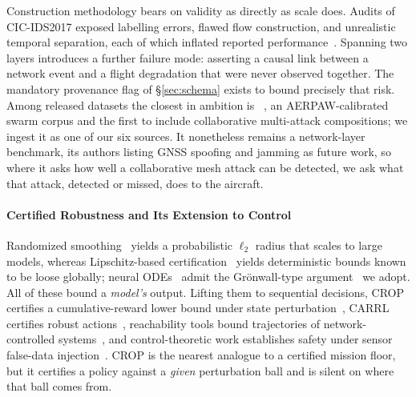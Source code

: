 Construction methodology bears on validity as directly as scale does. Audits of
CIC-IDS2017 exposed labelling errors, flawed flow construction, and unrealistic
temporal separation, each of which inflated reported
performance~\cite{engelen2021troubleshooting,sharafaldin2018cicids}. Spanning
two layers introduces a further failure mode: asserting a causal link between a
network event and a flight degradation that were never observed together. The
mandatory provenance flag of \S\ref{sec:schema} exists to bound precisely that
risk. Among released datasets the closest in ambition is
~\cite{uavcas2026}, an AERPAW-calibrated swarm corpus and the
first to include collaborative multi-attack compositions; we ingest it as one of
our six sources. It nonetheless remains a network-layer benchmark, its authors
listing GNSS spoofing and jamming as future work, so where it asks how well a
collaborative mesh attack can be detected, we ask what that attack, detected or
missed, does to the aircraft.

\paragraph{Certified Robustness and Its Extension to Control}
Randomized smoothing~\cite{cohen2019smoothing,salman2019provably} yields a
probabilistic $\ell_2$ radius that scales to large models, whereas
Lipschitz-based certification~\cite{pauli2022training,zhang2022rethinking}
yields deterministic bounds known to be loose globally; neural
ODEs~\cite{chen2018neuralode} admit the Gr\"onwall-type
argument~\cite{yan2020robustnode} we adopt. All of these bound a \emph{model's}
output. Lifting them to sequential decisions, CROP certifies a cumulative-reward
lower bound under state perturbation~\cite{wu2022crop}, CARRL certifies robust
actions~\cite{everett2021carrl}, reachability tools bound trajectories of
network-controlled systems~\cite{ivanov2019verisig,tran2020nnv}, and
control-theoretic work establishes safety under sensor false-data
injection~\cite{li2022lqg}. CROP is the nearest analogue to a certified mission
floor, but it certifies a policy against a \emph{given} perturbation ball and is
silent on where that ball comes from.

